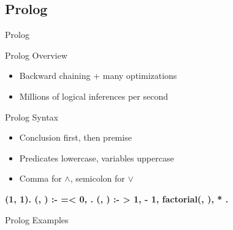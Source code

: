 \documentclass[14pt]{beamer}
\begin{document}
\subsection{Prolog}
\begin{frame}[fragile]{Prolog}
	\begin{block}{Prolog Overview}
		\begin{itemize}
			\item Backward chaining + many optimizations
			\item Millions of logical inferences per second
		\end{itemize}
	\end{block}
	\pause
	\begin{block}{Prolog Syntax}
		\begin{itemize}
			\item Conclusion first, then premise
			\item Predicates lowercase, variables uppercase
			\item Comma for $\land$, semicolon for $\lor$
		\end{itemize}
		\begin{semiverbatim}\bfseries\footnotesize
			(1, 1).
			(, \str{_}) :-  =< 0, .
			(, ) :-  > 1,    - 1,
			                   factorial(, ),    * .
		\end{semiverbatim}
	\end{block}
\end{frame}
\begin{frame}
	\begin{center}
		\Huge Prolog Examples
	\end{center}
\end{frame}
\end{document}
